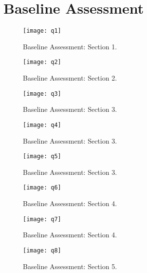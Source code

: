 
\chapter{Baseline Assessment}
\label{baseline-assessment}
\begin{figure}[h]
\centering
\texttt{[image: q1]}
\caption{Baseline Assessment: Section 1.}
\end{figure}

\begin{figure}[h]
\centering
\texttt{[image: q2]}
\caption{Baseline Assessment: Section 2.}
\end{figure}

\begin{figure}[h]
\centering
\texttt{[image: q3]}
\caption{Baseline Assessment: Section 3.}
\end{figure}

\begin{figure}[h]
\centering
\texttt{[image: q4]}
\caption{Baseline Assessment: Section 3.}
\end{figure}

\begin{figure}[h]
\centering
\texttt{[image: q5]}
\caption{Baseline Assessment: Section 3.}
\end{figure}

\begin{figure}[h]
\centering
\texttt{[image: q6]}
\caption{Baseline Assessment: Section 4.}
\end{figure}

\begin{figure}[h]
\centering
\texttt{[image: q7]}
\caption{Baseline Assessment: Section 4.}
\end{figure}

\begin{figure}[h]
\centering
\texttt{[image: q8]}
\caption{Baseline Assessment: Section 5.}
\end{figure}

